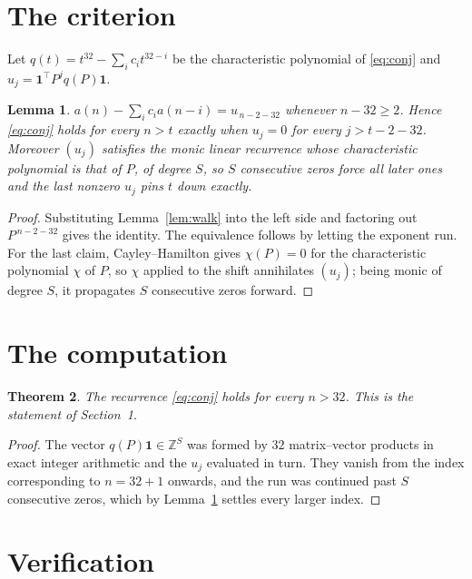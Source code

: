 \documentclass[11pt,a4paper]{article}
\theoremstyle{plain}
\newtheorem{theorem}{Theorem}
\newtheorem{lemma}[theorem]{Lemma}
\theoremstyle{definition}
\begin{document}
\section{The criterion}

Let $q(t)=t^{32}-\sum_i c_i t^{32-i}$ be the characteristic polynomial of
\eqref{eq:conj} and $u_j=\mathbf{1}^{\!\top}P^{j}q(P)\mathbf{1}$.

\begin{lemma}\label{lem:crit}
$a(n)-\sum_i c_i a(n-i)=u_{\,n-2-32}$ whenever $n-32\ge2$. Hence
\eqref{eq:conj} holds for every $n>t$ exactly when $u_j=0$ for every
$j>t-2-32$. Moreover $(u_j)$ satisfies the monic linear recurrence whose
characteristic polynomial is that of $P$, of degree $S$, so $S$ consecutive zeros force all
later ones and the last nonzero $u_j$ pins $t$ down exactly.
\end{lemma}

\begin{proof}
Substituting Lemma~\ref{lem:walk} into the left side and factoring out
$P^{\,n-2-32}$ gives the identity. The equivalence follows by letting the exponent
run. For the last claim, Cayley--Hamilton gives $\chi(P)=0$ for the characteristic
polynomial $\chi$ of $P$, so $\chi$ applied to the shift annihilates $(u_j)$; being monic of
degree $S$, it propagates $S$ consecutive zeros forward.
\end{proof}

\section{The computation}

\begin{theorem}
The recurrence \eqref{eq:conj} holds for every $n>32$. This is the statement of
Section~1.
\end{theorem}

\begin{proof}
The vector $q(P)\mathbf{1}\in\mathbb{Z}^{S}$ was formed by $32$ matrix--vector
products in exact integer arithmetic and the $u_j$ evaluated in turn. They vanish from the
index corresponding to $n=32+1$ onwards, and the run was continued past $S$ consecutive
zeros, which by Lemma~\ref{lem:crit} settles every larger index.
\end{proof}

\section{Verification}
\end{document}
